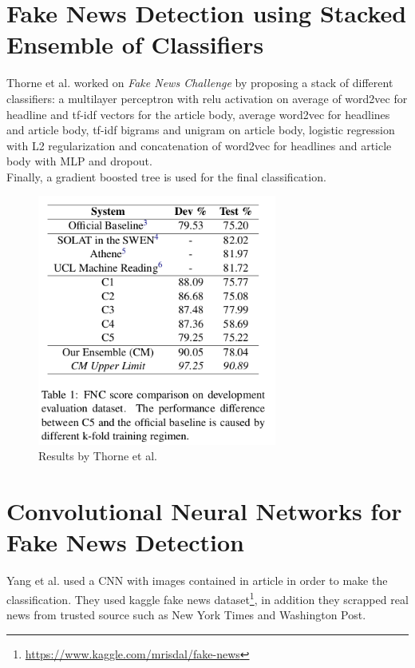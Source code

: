 \section{Fake News Detection using Stacked Ensemble of Classifiers}
Thorne et al.\cite{Thorne2017} worked on \textit{Fake News Challenge} by proposing a stack of different classifiers: a multilayer perceptron with relu activation on average of word2vec for headline and tf-idf vectors for the article body, average word2vec for headlines and article body, tf-idf bigrams and unigram on article body, logistic regression with L2 regularization and concatenation of word2vec for headlines and article body with MLP and dropout. \\

Finally, a gradient boosted tree is used for the final classification. \\

\begin{figure}[h]
 \centering
 \includegraphics[width=0.7\textwidth]{images/chap1_bis/rev6.png}
 \caption{Results by Thorne et al. }
 \label{fig:chap1:thorn1}
\end{figure}

\section{Convolutional Neural Networks for Fake News Detection\cite{Yang2018}}
Yang et al. used a CNN with images contained in article in order to make the classification. They used kaggle fake news dataset\footnote{\url{https://www.kaggle.com/mrisdal/fake-news}}, in addition they scrapped real news from trusted source such as New York Times and Washington Post. \\

